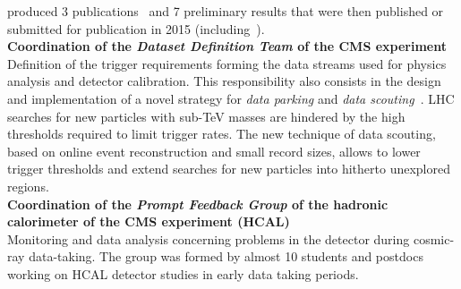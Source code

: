 \documentclass[10pt, a4paper]{article}
\newcommand{\years}[1]{\marginnote{\hskip-0.2in{\scriptsize #1}}}
\begin{document}
produced 3 publications~\cite{Khachatryan:2014ura,Khachatryan:2014dka,Khachatryan:2014gha}
and 7 preliminary results that were then published or submitted for
publication in 2015
(including~\cite{Khachatryan:2016yji,Khachatryan:2015ywa,Khachatryan:2015vaa}). \\[1em]
\years{03/2012 - 03/2013}\textbf{Coordination of the \emph{Dataset Definition
  Team} of the CMS experiment}\\ 
Definition of the trigger requirements forming the data streams used for physics analysis and detector
calibration. This responsibility also consists in the design and
implementation of a novel strategy for {\it data parking} and {\it
  data scouting}~\cite{CMS-DP-2012-022}. LHC searches for new particles with sub-TeV masses are hindered by the
high thresholds required to limit trigger rates. The new technique of data scouting, based on online event
reconstruction and small record sizes, allows to lower trigger thresholds and
extend searches for new particles into hitherto unexplored regions.
 \\ [1em]
\years{09/2008 - 09/2010}\textbf{Coordination of the \emph{Prompt
    Feedback Group} of the hadronic calorimeter of the CMS experiment (HCAL)}\\
Monitoring and data analysis concerning problems in the detector
during cosmic-ray data-taking. The group was formed by almost 10
students and postdocs working on HCAL detector studies in early data taking periods.
\end{document}
